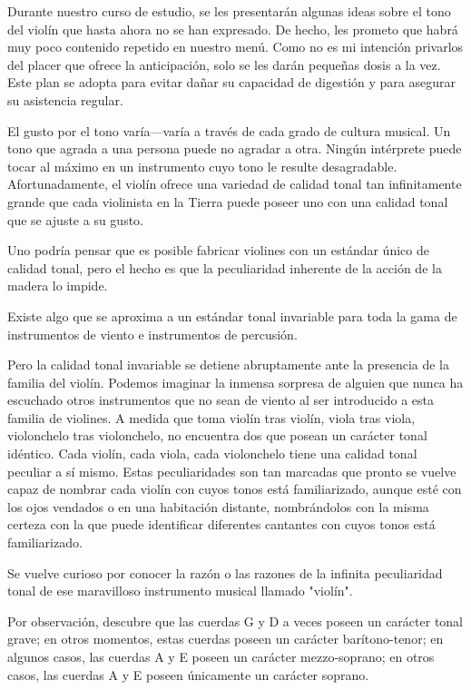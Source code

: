 \documentclass[12pt]{book}
\begin{document}
Durante nuestro curso de estudio, se les presentarán algunas ideas sobre el tono del violín que hasta ahora no se han expresado. De hecho, les prometo que habrá muy poco contenido repetido en nuestro menú. Como no es mi intención privarlos del placer que ofrece la anticipación, solo se les darán pequeñas dosis a la vez. Este plan se adopta para evitar dañar su capacidad de digestión y para asegurar su asistencia regular.

El gusto por el tono varía—varía a través de cada grado de cultura musical. Un tono que agrada a una persona puede no agradar a otra. Ningún intérprete puede tocar al máximo en un instrumento cuyo tono le resulte desagradable. Afortunadamente, el violín ofrece una variedad de calidad tonal tan infinitamente grande que cada violinista en la Tierra puede poseer uno con una calidad tonal que se ajuste a su gusto.

Uno podría pensar que es posible fabricar violines con un estándar único de calidad tonal, pero el hecho es que la peculiaridad inherente de la acción de la madera lo impide.

Existe algo que se aproxima a un estándar tonal invariable para toda la gama de instrumentos de viento e instrumentos de percusión.

Pero la calidad tonal invariable se detiene abruptamente ante la presencia de la familia del violín. Podemos imaginar la inmensa sorpresa de alguien que nunca ha escuchado otros instrumentos que no sean de viento al ser introducido a esta familia de violines. A medida que toma violín tras violín, viola tras viola, violonchelo tras violonchelo, no encuentra dos que posean un carácter tonal idéntico. Cada violín, cada viola, cada violonchelo tiene una calidad tonal peculiar a sí mismo. Estas peculiaridades son tan marcadas que pronto se vuelve capaz de nombrar cada violín con cuyos tonos está familiarizado, aunque esté con los ojos vendados o en una habitación distante, nombrándolos con la misma certeza con la que puede identificar diferentes cantantes con cuyos tonos está familiarizado.

Se vuelve curioso por conocer la razón o las razones de la infinita peculiaridad tonal de ese maravilloso instrumento musical llamado "violín".

Por observación, descubre que las cuerdas G y D a veces poseen un carácter tonal grave; en otros momentos, estas cuerdas poseen un carácter barítono-tenor; en algunos casos, las cuerdas A y E poseen un carácter mezzo-soprano; en otros casos, las cuerdas A y E poseen únicamente un carácter soprano.
\end{document}
